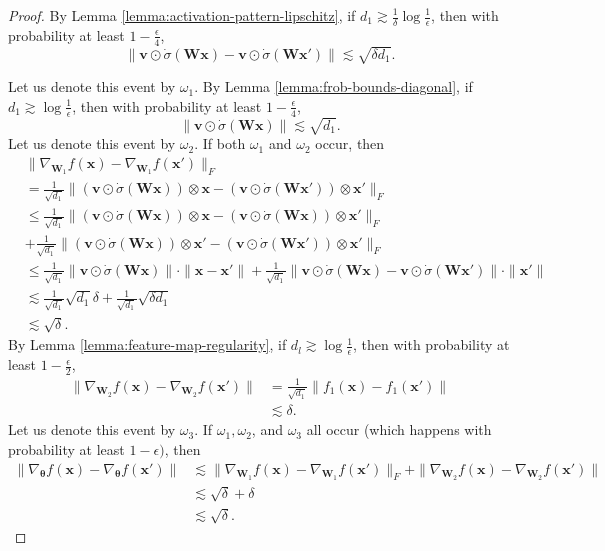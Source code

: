 \documentclass{article}
\theoremstyle{definition}
\def\vtheta{{\bm{\theta}}}
\def\vv{{\bm{v}}}
\def\vx{{\bm{x}}}
\def\mW{{\bm{W}}}
\begin{document}
\begin{proof}
    By Lemma \ref{lemma:activation-pattern-lipschitz},
    if $d_1 \gtrsim  \frac{1}{\delta}\log \frac{1}{\epsilon}$,
    then with probability at least $1 - \frac{\epsilon}{4}$,
    \[\|\vv \odot \dot{\sigma}(\mW\vx) - \vv \odot \dot{\sigma}(\mW \vx')\| \lesssim \sqrt{\delta d_1}. \]

Let us denote this event by $\omega_1$. By Lemma \ref{lemma:frob-bounds-diagonal}, if $d_1 \gtrsim \log \frac{1}{\epsilon}$, then with probability at least $1 - \frac{\epsilon}{4}$,
\[\|\vv \odot \dot{\sigma}(\mW \vx) \| \lesssim \sqrt{d_1}. \]
Let us denote this event by $\omega_2$. If both $\omega_1$ and $\omega_2$ occur, then
\begin{align*}
    &\|\nabla_{\mW_1}f(\vx) - \nabla_{\mW_1}f(\vx')\|_F\\&= \frac{1}{\sqrt{d_1}}\|(\vv \odot \dot{\sigma}(\mW\vx)) \otimes \vx - (\vv \odot \dot{\sigma}(\mW\vx')) \otimes \vx'\|_F\\
    &\leq \frac{1}{\sqrt{d_1}}\|(\vv \odot \dot{\sigma}(\mW\vx)) \otimes \vx - (\vv \odot \dot{\sigma}(\mW\vx)) \otimes \vx'\|_F \\&+ \frac{1}{\sqrt{d_1}}\|(\vv \odot \dot{\sigma}(\mW\vx)) \otimes \vx' - (\vv \odot \dot{\sigma}(\mW\vx')) \otimes \vx'\|_F\\
    &\leq \frac{1}{\sqrt{d_1}} \|\vv \odot \dot{\sigma}(\mW\vx)\| \cdot \|\vx - \vx'\| + \frac{1}{\sqrt{d_1}}\|\vv \odot \dot{\sigma}(\mW\vx) - \vv \odot \dot{\sigma}(\mW\vx')\|\cdot \|\vx'\|\\
    &\lesssim \frac{1}{\sqrt{d_1}}\sqrt{d_1} \delta + \frac{1}{\sqrt{d_1}}\sqrt{\delta d_1}\\
    &\lesssim \sqrt{\delta}.
\end{align*}
By Lemma \ref{lemma:feature-map-regularity}, if $d_l \gtrsim \log \frac{1}{\epsilon}$, then with probability at least $1 - \frac{\epsilon}{2}$,
\begin{align*}
    \|\nabla_{\mW_2}f(\vx) - \nabla_{\mW_2}f(\vx')\| &= \frac{1}{\sqrt{d_1}}\|f_1(\vx) - f_1(\vx')\|\\
    &\lesssim \delta.
\end{align*}
Let us denote this event by $\omega_3$. If $\omega_1, \omega_2$, and $\omega_3$ all occur (which happens with probability at least $1 - \epsilon)$, then
\begin{align*}
    \|\nabla_{\vtheta}f(\vx) - \nabla_{\vtheta}f(\vx')\| &\lesssim \|\nabla_{\mW_1}f(\vx) - \nabla_{\mW_1}f(\vx')\|_F + \|\nabla_{\mW_2}f(\vx)  - \nabla_{\mW_2}f(\vx')\|\\
    &\lesssim \sqrt{\delta} + \delta\\
    &\lesssim \sqrt{\delta}.
\end{align*}
\end{proof}
\end{document}
